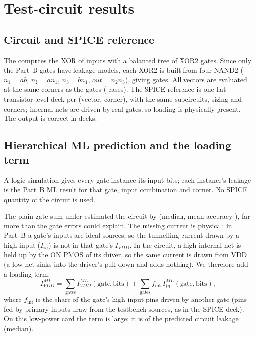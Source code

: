 \section{Test-circuit results}\label{sec:circuit}

\subsection{Circuit and SPICE reference}
The \TestCircuit{} computes the XOR of \CircuitNumInputs{} inputs with a balanced tree of
\CircuitNumXor{} XOR2 gates. Since only the Part~B gates have leakage models, each XOR2 is built
from four NAND2 ($n_1=\overline{ab}$, $n_2=\overline{a n_1}$, $n_3=\overline{b n_1}$,
$\mathit{out}=\overline{n_2 n_3}$), giving \CircuitGateMix{} gates. All \CircuitNumVectors{}
vectors are evaluated at the same \NumCorners{} corners as the gates (\CircuitNumSims{} cases). The
SPICE reference is one flat transistor-level deck per (vector, corner), with the same subcircuits,
sizing and corners; internal nets are driven by real gates, so loading is physically present. The
output is correct in \CircuitLogicOk{} decks.

\subsection{Hierarchical ML prediction and the loading term}
A logic simulation gives every gate instance its input bits; each instance's leakage is the
Part~B ML result for that gate, input combination and corner. No SPICE quantity of the circuit is
used.

The plain gate sum under-estimated the circuit by \CircuitNoLoadBias{} (median, mean accuracy
\CircuitNoLoadMeanAcc), far more than the gate errors could explain. The missing current is
physical: in Part~B a gate's inputs are ideal sources, so the tunnelling current drawn by a high
input ($I_{in}$) is not in that gate's $I_{VDD}$. In the circuit, a high internal net is held up
by the ON PMOS of its driver, so the same current is drawn from VDD (a low net sinks into the
driver's pull-down and adds nothing). We therefore add a loading term:
\begin{equation}
  I_{VDD}^{ML} = \sum_{\text{gates}} I_{VDD}^{ML}(\text{gate},\text{bits})
  + \sum_{\text{gates}} f_{\text{int}}\, I_{in}^{ML}(\text{gate},\text{bits}),
\end{equation}
where $f_{\text{int}}$ is the share of the gate's high input pins driven by another gate (pins fed
by primary inputs draw from the testbench sources, as in the SPICE deck). On this low-power card
the term is large: it is \CircuitLoadShare{} of the predicted circuit leakage (median).


